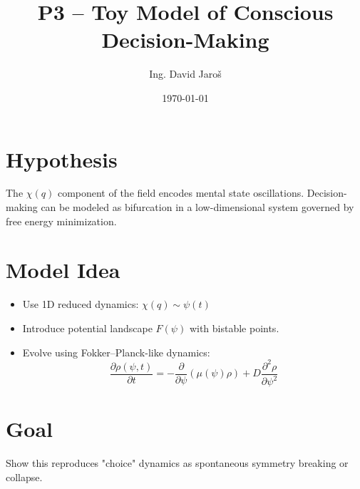 \documentclass[12pt]{article}
\title{P3 – Toy Model of Conscious Decision-Making}
\author{Ing. David Jaroš}
\date{\today}
\begin{document}
\maketitle

\section*{Hypothesis}
The $\chi(q)$ component of the field encodes mental state oscillations. Decision-making can be modeled as bifurcation in a low-dimensional system governed by free energy minimization.

\section*{Model Idea}
\begin{itemize}
\item Use 1D reduced dynamics: $\chi(q) \sim \psi(t)$
\item Introduce potential landscape $F(\psi)$ with bistable points.
\item Evolve using Fokker–Planck-like dynamics:
\[
\frac{\partial \rho(\psi,t)}{\partial t} = -\frac{\partial}{\partial \psi} \left( \mu(\psi) \rho \right) + D \frac{\partial^2 \rho}{\partial \psi^2}
\]
\end{itemize}

\section*{Goal}
Show this reproduces "choice" dynamics as spontaneous symmetry breaking or collapse.
\end{document}
